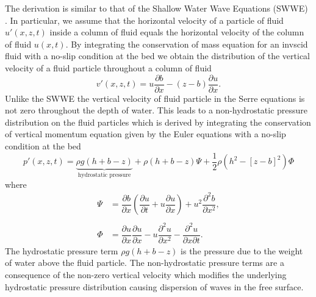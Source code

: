 The derivation is similar to that of the Shallow Water Wave Equations (SWWE) \cite{Liggett-1994}. In particular, we assume that the horizontal velocity of a particle of fluid $u'(x,z,t)$ inside a column of fluid equals the horizontal velocity of the column of fluid $u(x,t)$. By integrating the conservation of mass equation for an invscid fluid with a no-slip condition at the bed we obtain the distribution of the vertical velocity of a fluid particle throughout a column of fluid \cite{Zoppou-2014}
\begin{equation}
v'(x,z,t) = u \frac{\partial b}{\partial x} - (z - b) \frac{\partial u}{\partial x}.
\label{eqn:VertVelSerre}
\end{equation}
Unlike the SWWE the vertical velocity of fluid particle in the Serre equations is not zero throughout the depth of water. This leads to a non-hydrostatic pressure distribution on the fluid particles which is derived by integrating the conservation of vertical momentum equation given by the Euler equations with a no-slip condition at the bed \cite{Zoppou-2014}
\begin{equation}
\label{eqn:SerrePress}
 p'(x,z,t) = \underbrace{ \rho g \left(h + b - z\right)}_{\text{hydrostatic pressure}} + \rho \left(h + b - z\right) \Psi + \frac{1}{2} \rho \left(h^2 - \left[z - b \right]^2\right) {\Phi }
\end{equation} 
where
\begin{subequations}
	\begin{align}
	{ \Psi }  &= \dfrac{\partial b}{\partial x}\left(\dfrac{\partial u}{\partial t} + u\dfrac{\partial u}{\partial x} \right)  + u^2\dfrac{\partial^2 b}{\partial x^2}, \label{eqn:SerreeqnPsi} 
	\\ \nonumber \\
	{ \Phi }  &= \dfrac{\partial u }{\partial x} \dfrac{\partial u}{\partial x} -u \dfrac{\partial^2 u}{\partial x^2}  - \dfrac{\partial^2 u}{\partial x \partial t} . \label{eqn:SerreeqnPhi} 
	\end{align}
	\label{eqn:FullSerreNonConVarDef}
\end{subequations}
The hydrostatic pressure term $\rho g \left(h + b - z\right)$ is the pressure due to the weight of water above the fluid particle. The non-hydrostatic pressure terms are a consequence of the non-zero vertical velocity which modifies the underlying hydrostatic pressure distribution causing dispersion of waves in the free surface. 


